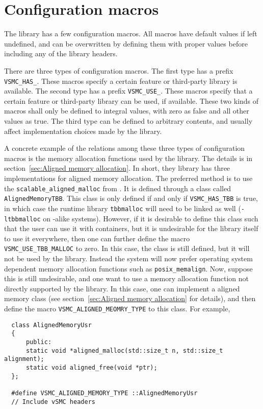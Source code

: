 \chapter{Configuration macros}
\label{chap:Configuration macros}

The library has a few configuration macros. All macros have default values if
left undefined, and can be overwritten by defining them with proper values
before including any of the library headers.

There are three types of configuration macros. The first type has a prefix
\verb|VSMC_HAS_|. These macros specify a certain feature or third-party library
is available. The second type has a prefix \verb|VSMC_USE_|. These macros
specify that a certain feature or third-party library can be used, if
available. These two kinds of macros shall only be defined to integral values,
with zero as false and all other values as true. The third type can be defined
to arbitrary contents, and usually affect implementation choices made by the
library.

A concrete example of the relations among these three types of configuration
macros is the memory allocation functions used by the library. The details is
in section~\ref{sec:Aligned memory allocation}. In short, they library has
three implementations for aligned memory allocation. The preferred method is to
use the \verb|scalable_aligned_malloc| from \tbb. It is defined through a class
called \verb|AlignedMemoryTBB|. This class is only defined if and only if
\verb|VSMC_HAS_TBB| is true, in which case the runtime library \verb|tbbmalloc|
will need to be linked as well (\verb|-ltbbmalloc| on \unix-alike systems).
However, if it is desirable to define this class such that the user can use it
with \stl containers, but it is undesirable for the library itself to use it
everywhere, then one can further define the macro \verb|VSMC_USE_TBB_MALLOC| to
zero. In this case, the class is still defined, but it will not be used by the
library. Instead the system will now prefer operating system dependent memory
allocation functions such as \verb|posix_memalign|. Now, suppose this is still
undesirable, and one want to use a memory allocation function not directly
supported by the library. In this case, one can implement a aligned memory
class (see section~\ref{sec:Aligned memory allocation} for details), and then
define the macro \verb|VSMC_ALIGNED_MEOMRY_TYPE| to this class. For example,
\begin{Verbatim}
  class AlignedMemoryUsr
  {
      public:
      static void *aligned_malloc(std::size_t n, std::size_t alignment);
      static void aligned_free(void *ptr);
  };

  #define VSMC_ALIGNED_MEMORY_TYPE ::AlignedMemoryUsr
  // Include vSMC headers
\end{Verbatim}

